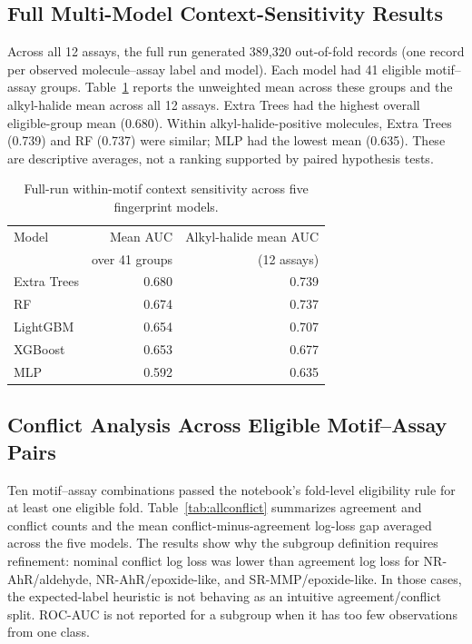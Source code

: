 \documentclass[conference]{IEEEtran}
\begin{document}
\subsection{Full Multi-Model Context-Sensitivity Results}
Across all 12 assays, the full run generated 389,320 out-of-fold records (one record per observed molecule--assay label and model). Each model had 41 eligible motif--assay groups. Table~\ref{tab:contextfull} reports the unweighted mean across these groups and the alkyl-halide mean across all 12 assays. Extra Trees had the highest overall eligible-group mean (0.680). Within alkyl-halide-positive molecules, Extra Trees (0.739) and RF (0.737) were similar; MLP had the lowest mean (0.635). These are descriptive averages, not a ranking supported by paired hypothesis tests.

\begin{table}[t]
\centering
\caption{Full-run within-motif context sensitivity across five fingerprint models.}
\label{tab:contextfull}
\small
\begin{tabular}{lrr}
\toprule
Model & Mean AUC  & Alkyl-halide mean AUC  \\
 & over 41 groups &  (12 assays) \\
\midrule
Extra Trees & 0.680 & 0.739 \\
RF & 0.674 & 0.737 \\
LightGBM & 0.654 & 0.707 \\
XGBoost & 0.653 & 0.677 \\
MLP & 0.592 & 0.635 \\
\bottomrule
\end{tabular}
\end{table}

\subsection{Conflict Analysis Across Eligible Motif--Assay Pairs}
Ten motif--assay combinations passed the notebook's fold-level eligibility rule for at least one eligible fold. Table~\ref{tab:allconflict} summarizes agreement and conflict counts and the mean conflict-minus-agreement log-loss gap averaged across the five models. The results show why the subgroup definition requires refinement: nominal conflict log loss was lower than agreement log loss for NR-AhR/aldehyde, NR-AhR/epoxide-like, and SR-MMP/epoxide-like. In those cases, the expected-label heuristic is not behaving as an intuitive agreement/conflict split. ROC-AUC is not reported for a subgroup when it has too few observations from one class.
\end{document}
